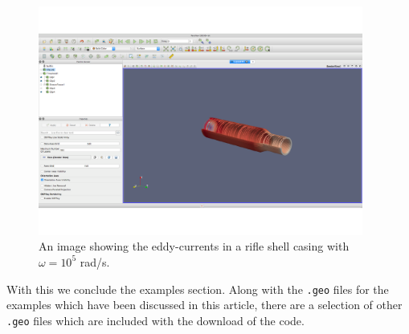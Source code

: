\begin{figure}[H]
\begin{center}
\includegraphics[width=0.95\textwidth]{Figures/rifleshell.pdf}
\caption{An image showing the eddy-currents in a rifle shell casing with $\omega=10^5$ rad/s.}\label{fig:riflevtk}
\end{center}
\end{figure}
\noindent
With this we conclude the examples section. Along with the \texttt{.geo} files for the examples which have been discussed in this article, there are a selection of other \texttt{.geo} files which are included with the download of the code.





